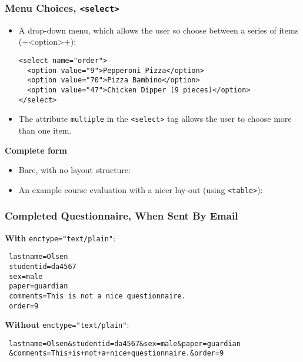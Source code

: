\documentclass[dvipsnames]{beamer}
\begin{document}
\begin{frame}[fragile]
\frametitle{Menu Choices, \texttt{<select>}}

\begin{itemize}
\item A drop-down menu, which allows the user so choose between a
  series of items (+<option>+):
  \begin{small}
\begin{verbatim}
<select name="order">
  <option value="9">Pepperoni Pizza</option>
  <option value="70">Pizza Bambino</option>
  <option value="47">Chicken Dipper (9 pieces)</option>
</select>
\end{verbatim}
  \end{small}
\item The attribute \verb+multiple+ in the \verb+<select>+ tag allows
  the user to choose more than one item.
\end{itemize}


\textbf{Complete form}

\begin{itemize}
\item Bare, with no layout structure: 
\item An example course evaluation with a nicer lay-out (using
  \verb+<table>+): 
\end{itemize}

\end{frame}

\begin{frame}[fragile]
\frametitle{Completed Questionnaire, When Sent By Email}

\textbf{With} \verb+enctype="text/plain"+:

\begin{small}
\begin{verbatim}
 lastname=Olsen
 studentid=da4567
 sex=male
 paper=guardian
 comments=This is not a nice questionnaire.
 order=9
\end{verbatim}
\end{small}


\textbf{Without} \verb+enctype="text/plain"+:

\begin{small}
\begin{verbatim}
 lastname=Olsen&studentid=da4567&sex=male&paper=guardian
 &comments=This+is+not+a+nice+questionnaire.&order=9
\end{verbatim}
\end{small}
\end{frame}
\end{document}

